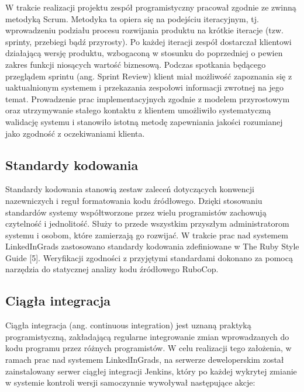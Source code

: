 W trakcie realizacji projektu zespół programistyczny pracował zgodnie ze zwinną metodyką Scrum. Metodyka ta opiera się na podejściu iteracyjnym, tj. wprowadzeniu podziału procesu rozwijania produktu na krótkie iteracje (tzw. sprinty, przebiegi bądź przyrosty). Po każdej iteracji zespół dostarczał klientowi działającą wersję produktu, wzbogaconą w stosunku do poprzedniej o pewien zakres funkcji niosących wartość biznesową. Podczas spotkania będącego przeglądem sprintu (ang. Sprint Review) klient miał możliwość zapoznania się z uaktualnionym systemem i przekazania zespołowi informacji zwrotnej na jego temat. Prowadzenie prac implementacyjnych zgodnie z modelem przyrostowym oraz utrzymywanie stałego kontaktu z klientem umożliwiło systematyczną walidację systemu i stanowiło istotną metodę zapewniania jakości rozumianej jako zgodność z oczekiwaniami klienta.

\subsection{Standardy kodowania}

Standardy kodowania stanowią zestaw zaleceń dotyczących konwencji nazewniczych i reguł formatowania kodu źródłowego. Dzięki stosowaniu standardów systemy współtworzone przez wielu programistów zachowują czytelność i jednolitość. Służy to przede wszystkim przyszłym administratorom systemu i osobom, które zamierzają go rozwijać. W trakcie prac nad systemem LinkedInGrads zastosowano standardy kodowania zdefiniowane w The Ruby Style Guide [5]. Weryfikacji zgodności z przyjętymi standardami dokonano za pomocą narzędzia do statycznej analizy kodu źródłowego RuboCop.

\subsection{Ciągła integracja}

Ciągła integracja (ang. continuous integration) jest uznaną praktyką programistyczną, zakładającą regularne integrowanie zmian wprowadzanych do kodu programu przez różnych programistów. W celu realizacji tego założenia, w ramach prac nad systemem LinkedInGrads, na serwerze deweloperskim został zainstalowany serwer ciągłej integracji Jenkins, który po każdej wykrytej zmianie w systemie kontroli wersji samoczynnie wywoływał następujące akcje:

